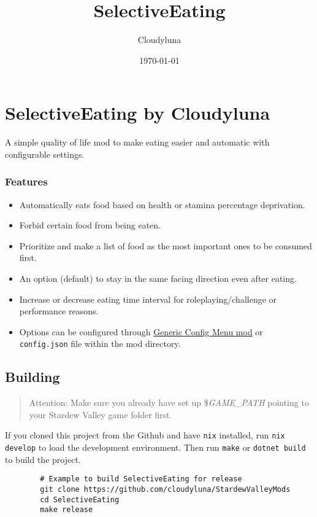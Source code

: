\documentclass[a4paper,12pt]{article}
\title{SelectiveEating}
\author{Cloudyluna}
\date{\today}
\begin{document}
	
	\section{SelectiveEating by Cloudyluna}
	
	A simple quality of life mod to make eating easier and automatic with configurable settings.
	
	\subsubsection{Features}
	
	\begin{itemize}
		\item Automatically eats food based on health or stamina percentage deprivation.
		\item Forbid certain food from being eaten.
		\item Prioritize and make a list of food as the most important ones to be consumed first.
		\item An option (default) to stay in the same facing direction even after eating.
		\item Increase or decrease eating time interval for roleplaying/challenge or performance reasons.
		\item Options can be configured through \href{https://www.nexusmods.com/stardewvalley/mods/5098}{Generic Config Menu mod} or \texttt{config.json} file within the mod directory.
	\end{itemize}
	
	
	\subsection{Building}
	
	\begin{quote}
		Attention: Make sure you already have set up \$\textit{GAME\_PATH} pointing to your Stardew Valley game folder first.
	\end{quote}

	If you cloned this project from the Github and have \texttt{nix} installed, run \texttt{nix develop} to load the development environment. Then run \texttt{make} or \texttt{dotnet build} to build the project.
	
	\begin{verbatim}
		# Example to build SelectiveEating for release
		git clone https://github.com/cloudyluna/StardewValleyMods
		cd SelectiveEating
		make release
	\end{verbatim}
	
\end{document}
